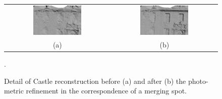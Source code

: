 \begin{figure}[tp]
\centering
\setlength{\tabcolsep}{1px}
\begin{tabular}{cc}
\includegraphics[width=0.48\textwidth]{./img/ch-incr-dens/castle09}&
\includegraphics[width=0.48\textwidth]{./img/ch-incr-dens/castle10}\\
(a)&(b)
\end{tabular}
\caption{Detail of Castle reconstruction before (a) and after (b) the photo-metric refinement in the correspondence of a merging spot.}.
\label{fig:detailcastle2}
\end{figure}


